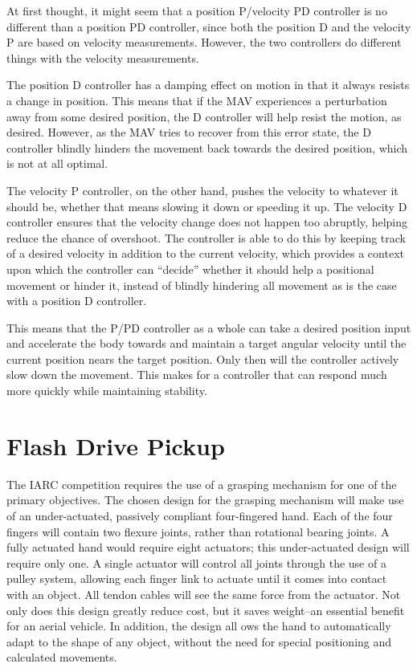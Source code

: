 \documentclass[12pt,letterpaper]{article}
\begin{document}
At first thought, it might seem that a position P/velocity PD controller is no
different than a position PD controller, since both the position D and the
velocity P are based on velocity measurements. However, the two controllers do
different things with the velocity measurements.

The position D controller has a damping effect on motion in that it always
resists a change in position. This means that if the MAV experiences a
perturbation away from some desired position, the D controller will help resist
the motion, as desired. However, as the MAV tries to recover from this error
state, the D controller blindly hinders the movement back towards the desired
position, which is not at all optimal.

The velocity P controller, on the other hand, pushes the velocity to whatever
it should be, whether that means slowing it down or speeding it up. The
velocity D controller ensures that the velocity change does not happen too
abruptly, helping reduce the chance of overshoot. The controller is able to do
this by keeping track of a desired velocity in addition to the current
velocity, which provides a context upon which the controller can ``decide''
whether it should help a positional movement or hinder it, instead of blindly
hindering all movement as is the case with a position D controller.

This means that the P/PD controller as a whole can take a desired position
input and accelerate the body towards and maintain a target angular velocity
until the current position nears the target position. Only then will the
controller actively slow down the movement. This makes for a controller that
can respond much more quickly while maintaining stability.


\section*{Flash Drive Pickup}
The IARC competition requires the use of a grasping mechanism for one of the 
primary objectives.  The chosen design for the grasping mechanism will make use 
of an under-actuated, passively compliant four-fingered hand.  Each of the four 
fingers will contain two flexure joints, rather than rotational bearing joints. 
A fully actuated hand would require eight actuators; this under-actuated design 
will require only one.  A single actuator will control all joints through the 
use of a pulley system, allowing each finger link to actuate until it comes into
 contact with an object.  All tendon cables will see the same force from the 
actuator.  Not only does this design greatly reduce cost, but it saves 
weight--an essential benefit for an aerial vehicle.  In addition, the design all
ows the hand to automatically adapt to the shape of any object, without the need
 for special positioning and calculated movements.  
\end{document}

